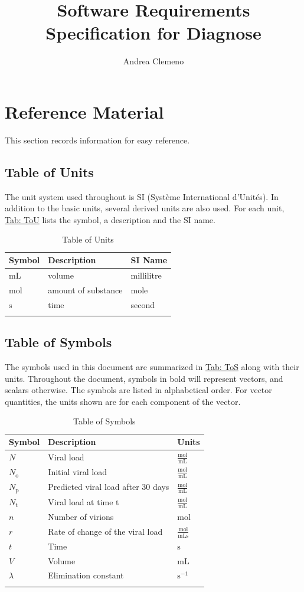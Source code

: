 \documentclass[12pt]{article}
\title{Software Requirements Specification for Diagnose}
\author{Andrea Clemeno}
\begin{document}
\maketitle
\tableofcontents
\newpage
\section{Reference Material}
\label{Sec:RefMat}
This section records information for easy reference.

\subsection{Table of Units}
\label{Sec:ToU}
The unit system used throughout is SI (Système International d'Unités). In addition to the basic units, several derived units are also used. For each unit, \hyperref[Table:ToU]{Tab: ToU} lists the symbol, a description and the SI name.

\begin{longtable}{l l l}
\toprule
\textbf{Symbol} & \textbf{Description} & \textbf{SI Name}
\\
\midrule
\endhead
${\text{mL}}$ & volume & millilitre
\\
${\text{mol}}$ & amount of substance & mole
\\
${\text{s}}$ & time & second
\\
\bottomrule
\caption{Table of Units}
\label{Table:ToU}
\end{longtable}
\subsection{Table of Symbols}
\label{Sec:ToS}
The symbols used in this document are summarized in \hyperref[Table:ToS]{Tab: ToS} along with their units. Throughout the document, symbols in bold will represent vectors, and scalars otherwise. The symbols are listed in alphabetical order. For vector quantities, the units shown are for each component of the vector.

\begin{longtable}{l l l}
\toprule
\textbf{Symbol} & \textbf{Description} & \textbf{Units}
\\
\midrule
\endhead
$N$ & Viral load & $\frac{\text{mol}}{\text{mL}}$
\\
${N_{\text{o}}}$ & Initial viral load & $\frac{\text{mol}}{\text{mL}}$
\\
${N_{\text{p}}}$ & Predicted viral load after 30 days & $\frac{\text{mol}}{\text{mL}}$
\\
${N_{\text{t}}}$ & Viral load at time t & $\frac{\text{mol}}{\text{mL}}$
\\
$n$ & Number of virions & ${\text{mol}}$
\\
$r$ & Rate of change of the viral load & $\frac{\text{mol}}{\text{mL}\text{s}}$
\\
$t$ & Time & ${\text{s}}$
\\
$V$ & Volume & ${\text{mL}}$
\\
$λ$ & Elimination constant & $\text{s}^{-1}$
\\
\bottomrule
\caption{Table of Symbols}
\label{Table:ToS}
\end{longtable}
\end{document}
